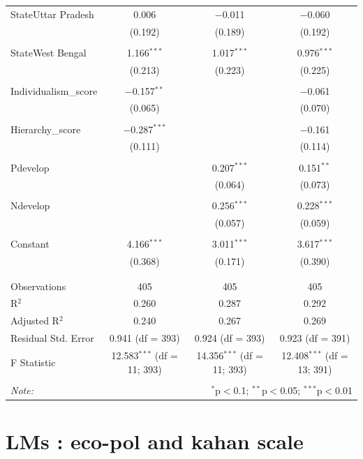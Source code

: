 \documentclass[
]{article}
\begin{document}
\begin{table}[!htbp]
\begin{tabular}{@{\extracolsep{5pt}}lccc}
 StateUttar Pradesh & 0.006 & $-$0.011 & $-$0.060 \\ 
  & (0.192) & (0.189) & (0.192) \\ 
  & & & \\ 
 StateWest Bengal & 1.166$^{***}$ & 1.017$^{***}$ & 0.976$^{***}$ \\ 
  & (0.213) & (0.223) & (0.225) \\ 
  & & & \\ 
 Individualism\_score & $-$0.157$^{**}$ &  & $-$0.061 \\ 
  & (0.065) &  & (0.070) \\ 
  & & & \\ 
 Hierarchy\_score & $-$0.287$^{***}$ &  & $-$0.161 \\ 
  & (0.111) &  & (0.114) \\ 
  & & & \\ 
 Pdevelop &  & 0.207$^{***}$ & 0.151$^{**}$ \\ 
  &  & (0.064) & (0.073) \\ 
  & & & \\ 
 Ndevelop &  & 0.256$^{***}$ & 0.228$^{***}$ \\ 
  &  & (0.057) & (0.059) \\ 
  & & & \\ 
 Constant & 4.166$^{***}$ & 3.011$^{***}$ & 3.617$^{***}$ \\ 
  & (0.368) & (0.171) & (0.390) \\ 
  & & & \\ 
\hline \\[-1.8ex] 
Observations & 405 & 405 & 405 \\ 
R$^{2}$ & 0.260 & 0.287 & 0.292 \\ 
Adjusted R$^{2}$ & 0.240 & 0.267 & 0.269 \\ 
Residual Std. Error & 0.941 (df = 393) & 0.924 (df = 393) & 0.923 (df = 391) \\ 
F Statistic & 12.583$^{***}$ (df = 11; 393) & 14.356$^{***}$ (df = 11; 393) & 12.408$^{***}$ (df = 13; 391) \\ 
\hline 
\hline \\[-1.8ex] 
\textit{Note:}  & \multicolumn{3}{r}{$^{*}$p$<$0.1; $^{**}$p$<$0.05; $^{***}$p$<$0.01} \\ 
\end{tabular} 
\end{table} 
\endgroup

\newpage

\hypertarget{lms-eco-pol-and-kahan-scale}{%
\section{LMs : eco-pol and kahan
scale}\label{lms-eco-pol-and-kahan-scale}}
\end{document}
